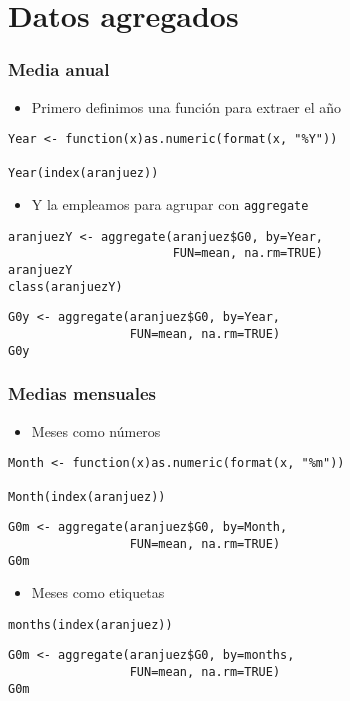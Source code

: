 \documentclass{beamer}
\begin{document}
\section{Datos agregados}
\label{sec-4}
\begin{frame}[fragile]
\frametitle{Media anual}
\label{sec-4-1}

\begin{itemize}
\item Primero definimos una función para extraer el año
\end{itemize}

\lstset{language=R}
\begin{lstlisting}
Year <- function(x)as.numeric(format(x, "%Y"))

Year(index(aranjuez))
\end{lstlisting}
\begin{itemize}
\item Y la empleamos para agrupar con \texttt{aggregate}
\end{itemize}

\lstset{language=R}
\begin{lstlisting}
aranjuezY <- aggregate(aranjuez$G0, by=Year,
                       FUN=mean, na.rm=TRUE)
aranjuezY
class(aranjuezY)
\end{lstlisting}


\lstset{language=R}
\begin{lstlisting}
G0y <- aggregate(aranjuez$G0, by=Year,
                 FUN=mean, na.rm=TRUE)
G0y
\end{lstlisting}
\end{frame}
\begin{frame}[fragile]
\frametitle{Medias mensuales}
\label{sec-4-2}

\begin{itemize}
\item Meses como números
\end{itemize}

\lstset{language=R}
\begin{lstlisting}
Month <- function(x)as.numeric(format(x, "%m"))

Month(index(aranjuez))
\end{lstlisting}


\lstset{language=R}
\begin{lstlisting}
G0m <- aggregate(aranjuez$G0, by=Month,
                 FUN=mean, na.rm=TRUE)
G0m
\end{lstlisting}

\begin{itemize}
\item Meses como etiquetas
\end{itemize}

\lstset{language=R}
\begin{lstlisting}
months(index(aranjuez))
\end{lstlisting}


\lstset{language=R}
\begin{lstlisting}
G0m <- aggregate(aranjuez$G0, by=months,
                 FUN=mean, na.rm=TRUE)
G0m
\end{lstlisting}
\end{frame}
\end{document}
